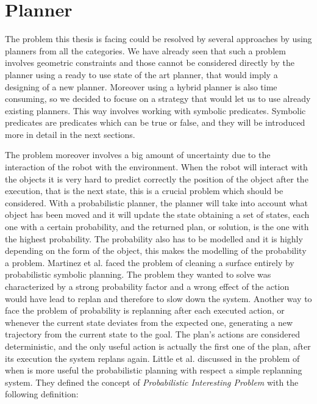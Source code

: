 \section{Planner}
The problem this thesis is facing could be resolved by several approaches by using planners from all the categories. We have already seen that such a problem involves geometric constraints and those cannot be considered directly by the planner using a ready to use state of the art planner, that would imply a designing of a new planner. Moreover using a hybrid planner is also time consuming, so we decided to focuse on a strategy that would let us to use already existing planners. This way involves working with symbolic predicates. Symbolic predicates are predicates which can be true or false, and they will be introduced more in detail in the next sections. 

The problem moreover involves a big amount of uncertainty due to the interaction of the robot with the environment. When the robot will interact with the objects it is very hard to predict correctly the position of the object after the execution, that is the next state, this is a crucial problem which should be considered. With a probabilistic planner, the planner will take into account what object has been moved and it will update the state obtaining a set of states, each one with a certain probability, and the returned plan, or solution, is the one with the highest probability. The probability also has to be modelled and it is highly depending on the form of the object, this makes the modelling of the probability a problem.
Martinez et al. \citep{martinez2015planning} faced the problem of cleaning a surface entirely by probabilistic symbolic planning. The problem they wanted to solve was characterized by a strong probability factor and a wrong effect of the action would have lead to replan and therefore to slow down the system.
Another way to face the problem of probability is replanning after each executed action, or whenever the current state deviates from the expected one, generating a new trajectory from the current state to the goal. The plan's actions are considered deterministic, and the only useful action is actually the first one of the plan, after its execution the system replans again. Little et al. discussed in \cite{little2007probabilistic} the problem of when is more useful the probabilistic planning with respect a simple replanning system. 
They defined the concept of \textit{Probabilistic Interesting Problem} with the following definition:

